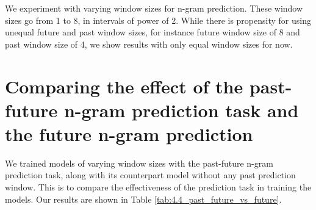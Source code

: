 We experiment with varying window sizes for n-gram prediction. These window sizes go from 1 to 8, in intervals of power of 2. While there is propensity for using unequal future and past window sizes, for instance future window size of 8 and past window size of 4, we show results with only equal window sizes for now.

\section{Comparing the effect of the past-future n-gram prediction task and the future n-gram prediction}

We trained models of varying window sizes with the past-future n-gram prediction task, along with its counterpart model without any past prediction window. This is to compare the effectiveness of the prediction task in training the models. Our results are shown in Table \ref{tab:4.4_past_future_vs_future}.

